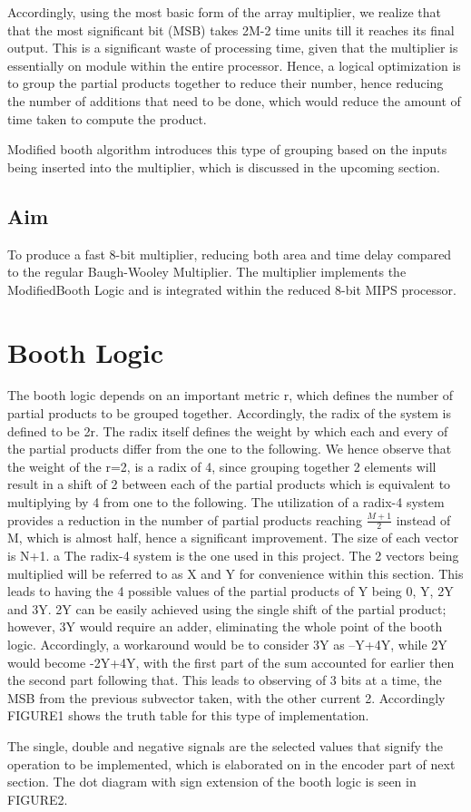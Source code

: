 \documentclass[conference]{IEEEtran}
\begin{document}
Accordingly, using the most basic form of the array multiplier, we realize that that the most significant bit (MSB) takes 2M-2 time units till it reaches its final output. This is a significant waste of processing time, given that the multiplier is essentially on module within the entire processor. Hence, a logical optimization is to group the partial products together to reduce their number, hence reducing the number of additions that need to be done, which would reduce the amount of time taken to compute the product.

Modified booth algorithm introduces this type of grouping based on the inputs being inserted into the multiplier, which is discussed in the upcoming section.


\subsection{Aim}

To produce a fast 8-bit multiplier, reducing both area and time delay compared to the regular Baugh-Wooley Multiplier. The multiplier implements the ModifiedBooth Logic and is integrated within the reduced 8-bit MIPS processor.


\section{Booth Logic}

The booth logic depends on an important metric r, which defines the number of partial products to be grouped together. Accordingly, the radix of the system is defined to be 2r. The radix itself defines the weight by which each and every of the partial products differ from the one to the following. We hence observe that the weight of the r=2, is a radix of 4, since grouping together 2 elements will result in a shift of 2 between each of the partial products which is equivalent to multiplying by 4 from one to the following. The utilization of a radix-4 system provides a reduction in the number of partial products reaching $\frac{M+1}{2}$
instead of M, which is almost half, hence a significant improvement. The size of each vector is N+1.
a
The radix-4 system is the one used in this project. The 2 vectors being multiplied will be referred to as X and Y for convenience within this section. This leads to having the 4 possible values of the partial products of Y being 0, Y, 2Y and 3Y. 2Y can be easily achieved using the single shift of the partial product; however, 3Y would require an adder, eliminating the whole point of the booth logic. Accordingly, a workaround would be to consider 3Y as –Y+4Y, while 2Y would become -2Y+4Y, with the first part of the sum accounted for earlier then the second part following that. This leads to observing of 3 bits at a time, the MSB from the previous subvector taken, with the other current 2. Accordingly FIGURE1 shows the truth table for this type of implementation.

The single, double and negative signals are the selected values that signify the operation to be implemented, which is elaborated on in the encoder part of next section. The dot diagram with sign extension of the booth logic is seen in FIGURE2.







\end{document}
